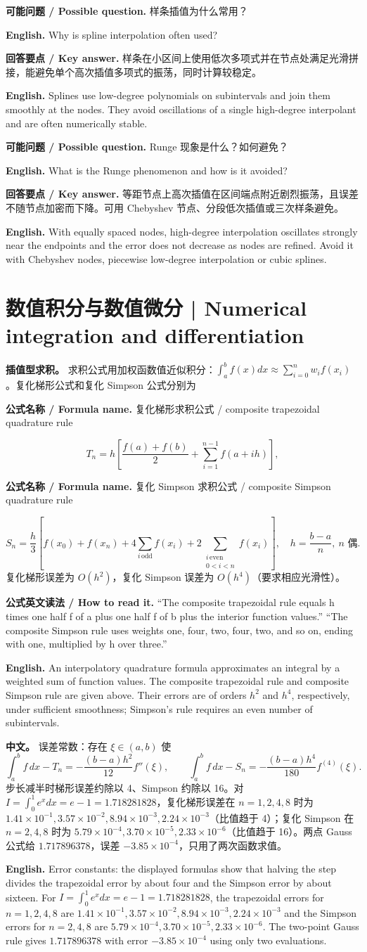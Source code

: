 \documentclass[UTF8,11pt,a4paper]{ctexart}
\newcommand{\EN}[1]{\par\noindent\textbf{English.} #1\par}
\newcommand{\READ}[1]{\par\noindent\textbf{公式英文读法 / How to read it.} #1\par}
\newcommand{\FORMULA}[2]{\par\noindent\textbf{公式名称 / Formula name.} #1 / #2\par}
\newcommand{\ASK}[4]{\par\noindent\textbf{可能问题 / Possible question.} #1\par\EN{#2}\noindent\textbf{回答要点 / Key answer.} #3\par\EN{#4}\medskip}
\newcommand{\APS}[2]{\par\noindent\textbf{中文。} #1\par\noindent\textbf{English.} #2\par\smallskip}
\begin{document}
\ASK{样条插值为什么常用？}{Why is spline interpolation often used?}{样条在小区间上使用低次多项式并在节点处满足光滑拼接，能避免单个高次插值多项式的振荡，同时计算较稳定。}{Splines use low-degree polynomials on subintervals and join them smoothly at the nodes. They avoid oscillations of a single high-degree interpolant and are often numerically stable.}

\ASK{Runge 现象是什么？如何避免？}{What is the Runge phenomenon and how is it avoided?}{等距节点上高次插值在区间端点附近剧烈振荡，且误差不随节点加密而下降。可用 Chebyshev 节点、分段低次插值或三次样条避免。}{With equally spaced nodes, high-degree interpolation oscillates strongly near the endpoints and the error does not decrease as nodes are refined. Avoid it with Chebyshev nodes, piecewise low-degree interpolation or cubic splines.}

\section{数值积分与数值微分 | Numerical integration and differentiation}
\noindent\textbf{插值型求积。} 求积公式用加权函数值近似积分：$\int_a^bf(x)dx\approx\sum_{i=0}^nw_if(x_i)$。复化梯形公式和复化 Simpson 公式分别为
\FORMULA{复化梯形求积公式}{composite trapezoidal quadrature rule}
\[
T_n=h\left[\frac{f(a)+f(b)}2+\sum_{i=1}^{n-1}f(a+ih)\right],
\]
\FORMULA{复化 Simpson 求积公式}{composite Simpson quadrature rule}
\[
S_n=\frac h3\left[f(x_0)+f(x_n)+4\sum_{i\,\mathrm{odd}}f(x_i)+2\sum_{\substack{i\,\mathrm{even}\\0<i<n}}f(x_i)\right],\quad h=\frac{b-a}{n},\ n\text{ 偶}.
\]
复化梯形误差为 $O(h^2)$，复化 Simpson 误差为 $O(h^4)$（要求相应光滑性）。
\READ{“The composite trapezoidal rule equals h times one half f of a plus one half f of b plus the interior function values.” “The composite Simpson rule uses weights one, four, two, four, two, and so on, ending with one, multiplied by h over three.”}
\EN{An interpolatory quadrature formula approximates an integral by a weighted sum of function values. The composite trapezoidal rule and composite Simpson rule are given above. Their errors are of orders $h^2$ and $h^4$, respectively, under sufficient smoothness; Simpson's rule requires an even number of subintervals.}
\APS{误差常数：存在 $\xi\in(a,b)$ 使
\[
\int_a^bf\,dx-T_n=-\frac{(b-a)h^2}{12}f''(\xi),\qquad
\int_a^bf\,dx-S_n=-\frac{(b-a)h^4}{180}f^{(4)}(\xi).
\]
步长减半时梯形误差约除以 4、Simpson 约除以 16。对 $I=\int_0^1e^x dx=e-1=1.718281828$，复化梯形误差在 $n=1,2,4,8$ 时为 $1.41\times10^{-1},3.57\times10^{-2},8.94\times10^{-3},2.24\times10^{-3}$（比值趋于 4）；复化 Simpson 在 $n=2,4,8$ 时为 $5.79\times10^{-4},3.70\times10^{-5},2.33\times10^{-6}$（比值趋于 16）。两点 Gauss 公式给 $1.717896378$，误差 $-3.85\times10^{-4}$，只用了两次函数求值。}{Error constants: the displayed formulas show that halving the step divides the trapezoidal error by about four and the Simpson error by about sixteen. For $I=\int_0^1e^x dx=e-1=1.718281828$, the trapezoidal errors for $n=1,2,4,8$ are $1.41\times10^{-1},3.57\times10^{-2},8.94\times10^{-3},2.24\times10^{-3}$ and the Simpson errors for $n=2,4,8$ are $5.79\times10^{-4},3.70\times10^{-5},2.33\times10^{-6}$. The two-point Gauss rule gives $1.717896378$ with error $-3.85\times10^{-4}$ using only two evaluations.}
\end{document}
